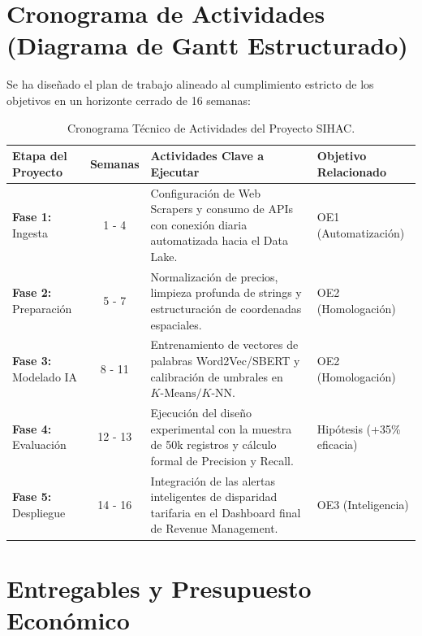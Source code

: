 \documentclass[11pt,a4paper]{article}
\begin{document}
\section{Cronograma de Actividades (Diagrama de Gantt Estructurado)}
Se ha diseñado el plan de trabajo alineado al cumplimiento estricto de los objetivos en un horizonte cerrado de 16 semanas:

\begin{table}[htbp]
\centering
\caption{Cronograma Técnico de Actividades del Proyecto SIHAC.}
\vspace{0.2cm}
\begin{tabularx}{\textwidth}{l c X l}
\toprule
\textbf{Etapa del Proyecto} & \textbf{Semanas} & \textbf{Actividades Clave a Ejecutar} & \textbf{Objetivo Relacionado} \\
\midrule
\textbf{Fase 1:} Ingesta & 1 - 4 & Configuración de Web Scrapers y consumo de APIs con conexión diaria automatizada hacia el Data Lake. & OE1 (Automatización) \\ \addlinespace
\textbf{Fase 2:} Preparación & 5 - 7 & Normalización de precios, limpieza profunda de strings y estructuración de coordenadas espaciales. & OE2 (Homologación) \\ \addlinespace
\textbf{Fase 3:} Modelado IA & 8 - 11 & Entrenamiento de vectores de palabras Word2Vec/SBERT y calibración de umbrales en $K\text{-Means} / K\text{-NN}$. & OE2 (Homologación) \\ \addlinespace
\textbf{Fase 4:} Evaluación & 12 - 13 & Ejecución del diseño experimental con la muestra de 50k registros y cálculo formal de Precision y Recall. & Hipótesis (+35\% eficacia) \\ \addlinespace
\textbf{Fase 5:} Despliegue & 14 - 16 & Integración de las alertas inteligentes de disparidad tarifaria en el Dashboard final de Revenue Management. & OE3 (Inteligencia) \\
\bottomrule
\end{tabularx}
\label{tab:cronograma_gantt}
\end{table}

\newpage

\section{Entregables y Presupuesto Económico}
\end{document}
